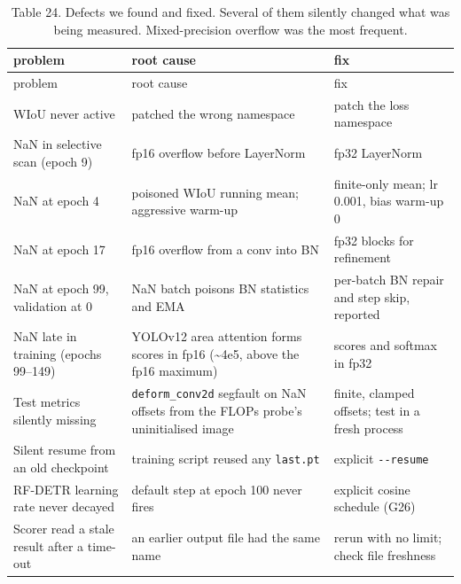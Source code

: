 \documentclass[
  10pt,
]{article}
\begin{document}
\begin{longtable}[]{@{}
  >{\raggedright\arraybackslash}p{}
  >{\raggedright\arraybackslash}p{}
  >{\raggedright\arraybackslash}p{}@{}}
\caption{Table 24. Defects we found and fixed. Several of them silently
changed what was being measured. Mixed-precision overflow was the most
frequent.}\tabularnewline
\toprule\noalign{}
\begin{minipage}[b]{\linewidth}\raggedright
problem
\end{minipage} & \begin{minipage}[b]{\linewidth}\raggedright
root cause
\end{minipage} & \begin{minipage}[b]{\linewidth}\raggedright
fix
\end{minipage} \\
\midrule\noalign{}
\endfirsthead
\toprule\noalign{}
\begin{minipage}[b]{\linewidth}\raggedright
problem
\end{minipage} & \begin{minipage}[b]{\linewidth}\raggedright
root cause
\end{minipage} & \begin{minipage}[b]{\linewidth}\raggedright
fix
\end{minipage} \\
\midrule\noalign{}
\endhead
\bottomrule\noalign{}
\endlastfoot
WIoU never active & patched the wrong namespace & patch the loss
namespace \\
NaN in selective scan (epoch 9) & fp16 overflow before LayerNorm & fp32
LayerNorm \\
NaN at epoch 4 & poisoned WIoU running mean; aggressive warm-up &
finite-only mean; lr 0.001, bias warm-up 0 \\
NaN at epoch 17 & fp16 overflow from a conv into BN & fp32 blocks for
refinement \\
NaN at epoch 99, validation at 0 & NaN batch poisons BN statistics and
EMA & per-batch BN repair and step skip, reported \\
NaN late in training (epochs 99--149) & YOLOv12 area attention forms
scores in fp16 (\textasciitilde4e5, above the fp16 maximum) & scores and
softmax in fp32 \\
Test metrics silently missing & \texttt{deform\_conv2d} segfault on NaN
offsets from the FLOPs probe's uninitialised image & finite, clamped
offsets; test in a fresh process \\
Silent resume from an old checkpoint & training script reused any
\texttt{last.pt} & explicit \texttt{-\/-resume} \\
RF-DETR learning rate never decayed & default step at epoch 100 never
fires & explicit cosine schedule (G26) \\
Scorer read a stale result after a time-out & an earlier output file had
the same name & rerun with no limit; check file freshness \\
\end{longtable}
\end{document}
